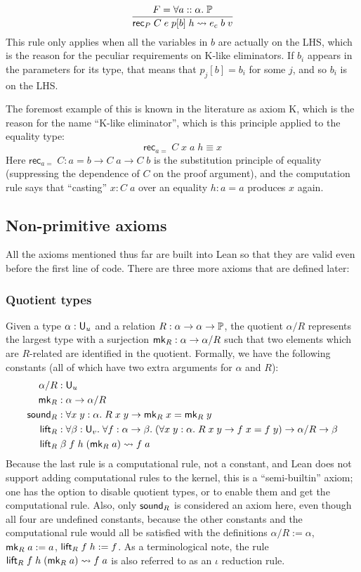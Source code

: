 $$\frac{F=\forall a::\alpha.\;\P}{\rec_P\;C\;e\;p[b]\;h\rightsquigarrow e_c\;b\;v}$$
This rule only applies when all the variables in $b$ are actually on the LHS, which is the reason for the peculiar requirements on K-like eliminators. If $b_i$ appears in the parameters for its type, that means that $p_j[b]=b_i$ for some $j$, and so $b_i$ is on the LHS. 

The foremost example of this is known in the literature as axiom K, which is the reason for the name ``K-like eliminator'', which is this principle applied to the equality type:
$$\mathsf{rec}_{a=}\;C\;x\;a\;h\equiv x$$
Here $\mathsf{rec}_{a=}\;C:a=b\to C\;a\to C\;b$ is the substitution principle of equality (suppressing the dependence of $C$ on the proof argument), and the computation rule says that ``casting'' $x:C\;a$ over an equality $h:a=a$ produces $x$ again.
%
\subsection{Non-primitive axioms}

All the axioms mentioned thus far are built into Lean so that they are valid even before the first line of code. There are three more axioms that are defined later:

\subsubsection{Quotient types}
Given a type $\alpha:\U_u$ and a relation $R:\alpha\to\alpha\to\P$, the quotient $\alpha/R$ represents the largest type with a surjection $\mk_R:\alpha\to\alpha/R$ such that two elements which are $R$-related are identified in the quotient. Formally, we have the following constants (all of which have two extra arguments for $\alpha$ and $R$):
\begin{align*}
\alpha/R&:\U_u\\
\mk_R&:\alpha\to\alpha/R\\
\sound_R&:\forall x\;y:\alpha.\;R\;x\;y\to \mk_R\;x=\mk_R\;y\\
\lift_R&:\forall\beta:\U_v.\;\forall f:\alpha\to\beta.\;(\forall x\;y:\alpha.\;R\;x\;y\to f\;x=f\;y)\to \alpha/R\to\beta\\
\lift_R&\;\beta\;f\;h\;(\mk_R\;a)\rightsquigarrow f\;a
\end{align*}
Because the last rule is a computational rule, not a constant, and Lean does not support adding computational rules to the kernel, this is a ``semi-builtin'' axiom; one has the option to disable quotient types, or to enable them and get the computational rule. Also, only $\sound_R$ is considered an axiom here, even though all four are undefined constants, because the other constants and the computational rule would all be satisfied with the definitions $\alpha/R:=\alpha$, $\mk_R\;a:=a$, $\lift_R\;f\;h:=f$. As a terminological note, the rule $\lift_R\;f\;h\;(\mk_R\;a)\rightsquigarrow f\;a$ is also referred to as an $\iota$ reduction rule.


